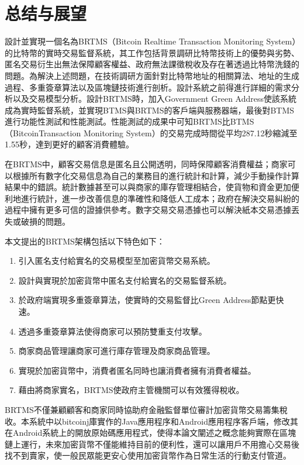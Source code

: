  
\chapter{总结与展望}
設計並實現一個名為BRTMS（Bitcoin Realtime Transaction Monitoring System）的比特幣的實時交易監督系統，其工作包括背景調研比特幣技術上的優勢與劣勢、匿名交易衍生出無法保障顧客權益、政府無法課徵稅收及存在著透過比特幣洗錢的問題。為解決上述問題，在技術調研方面針對比特幣地址的相關算法、地址的生成過程、多重簽章算法以及區塊鏈技術進行剖析。設計系統之前得進行詳細的需求分析以及交易模型分析。設計BRTMS時，加入Government Green Address使該系統成為實時監督系統，並實現BTMS與BRTMS的客戶端與服務器端，最後對BTMS進行功能性測試和性能測試。性能測試的成果中可知BRTMS比BTMS（BitcoinTransaction Monitoring System）的交易完成時間從平均287.12秒縮減至1.55秒，達到更好的顧客消費體驗。

在BRTMS中，顧客交易信息是匿名且公開透明，同時保障顧客消費權益；商家可以根據所有數字化交易信息為自己的業務目的進行統計和計算，減少手動操作計算結果中的錯誤。統計數據甚至可以與商家的庫存管理相結合，使貨物和資金更加便利地進行統計，進一步改善信息的準確性和降低人工成本；政府在解決交易糾紛的過程中擁有更多可信的證據供參考。數字交易交易憑據也可以解決紙本交易憑據丟失或破損的問題。

本文提出的BRTMS架構包括以下特色如下：

		\begin{enumerate}
			\item 引入匿名支付給實名的交易模型至加密貨幣交易系統。
			\item 設計與實現於加密貨幣中匿名支付給實名的交易監督系統。
			\item 於政府端實現多重簽章算法，使實時的交易監督比Green Address節點更快速。
			\item 透過多重簽章算法使得商家可以預防雙重支付攻擊。
			\item 商家商品管理讓商家可進行庫存管理及商家商品管理。
			\item 實現於加密貨幣中，消費者匿名同時也讓消費者擁有消費者權益。
			\item 藉由將商家實名，BRTMS使政府主管機關可以有效獲得稅收。
		\end{enumerate}
BRTMS不僅兼顧顧客和商家同時協助府金融監督單位審計加密貨幣交易籌集稅收。本系統中以bitcoinj庫實作的Java應用程序和Android應用程序客戶端，修改其在Android系統上的開放原始碼應用程式，使得本論文闡述之概念能夠實際在區塊鏈上運行，未來加密貨幣不僅能維持目前的便利性，還可以讓用戶不用擔心交易後找不到賣家，使一般民眾能更安心使用加密貨幣作為日常生活的行動支付管道。
